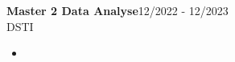 \documentclass{article}
\begin{document}
\begin{paracol}{2}
\vspace{3mm}

\colorbox{maincolor}{%
  \begin{minipage}{\linewidth}
    \noindent
    \textbf{Master 2 Data Analyse}\hfill 12/2022 - 12/2023\\
    DSTI\\[-0.3em]
    \begin{itemize}[leftmargin=*]
      \item 
    \end{itemize}
  \end{minipage}}       %

\end{paracol}
\end{document}
